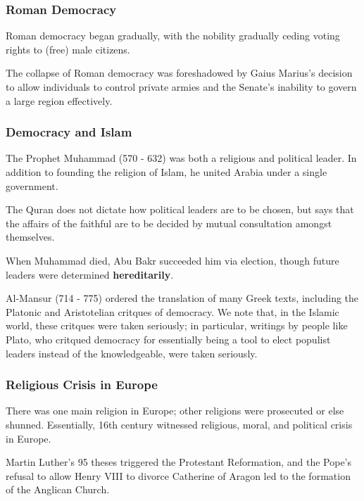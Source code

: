 \documentclass[letterpaper]{article}
\begin{document}
\subsubsection{Roman Democracy}
Roman democracy began gradually, with the nobility gradually ceding voting rights to (free) male citizens. 

\bigskip 

The collapse of Roman democracy was foreshadowed by Gaius Marius's decision to allow individuals to control private armies and the Senate's inability to govern a large region effectively. 

\subsubsection{Democracy and Islam}
The Prophet Muhammad (570 - 632) was both a religious and political leader. In addition to founding the religion of Islam, he united Arabia under a single government. 

\bigskip 

The Quran does not dictate how political leaders are to be chosen, but says that the affairs of the faithful are to be decided by mutual consultation amongst themselves. 

\bigskip 

When Muhammad died, Abu Bakr succeeded him via election, though future leaders were determined \textbf{hereditarily}.

\bigskip 

Al-Mansur (714 - 775) ordered the translation of many Greek texts, including the Platonic and Aristotelian critques of democracy. We note that, in the Islamic world, these critques were taken seriously; in particular, writings by people like Plato, who critqued democracy for essentially being a tool to elect populist leaders instead of the knowledgeable, were taken seriously.

\subsubsection{Religious Crisis in Europe}
There was one main religion in Europe; other religions were prosecuted or else shunned. Essentially, 16th century witnessed religious, moral, and political crisis in Europe. 

\bigskip 

Martin Luther's 95 theses triggered the Protestant Reformation, and the Pope's refusal to allow Henry VIII to divorce Catherine of Aragon led to the formation of the Anglican Church. 
\end{document}
